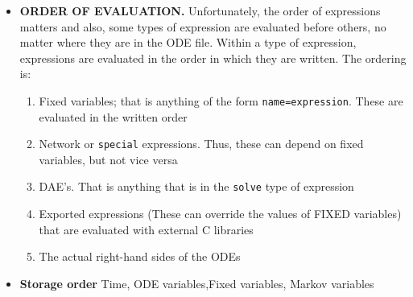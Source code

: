 \begin{itemize}
\item {\bf ORDER OF EVALUATION.}  Unfortunately, the order of expressions matters and also, some types of expression are evaluated before others, no matter where they are in the ODE file. Within a type of expression, expressions are evaluated in the order in which they are written. The ordering is:
\begin{enumerate}
\item Fixed variables; that is anything of the form {\tt name=expression}. These are evaluated in the written order
\item Network or {\tt special} expressions.  Thus, these can depend on fixed variables, but not vice versa
\item DAE's. That is anything that is in the {\tt solve} type of expression
\item Exported expressions (These can override the values of FIXED variables) that are evaluated with external C libraries
\item The actual right-hand sides of the ODEs
\end{enumerate}
\item {\bf Storage order}  Time, ODE variables,Fixed variables, Markov variables
\end{itemize}

 
